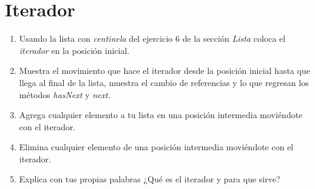 \documentclass[12pt]{article} %
\begin{document}
\section{Iterador}
\begin{enumerate}
\item Usando la lista con \textit{centinela} del ejercicio 6 de la sección \textit{Lista} coloca el \textit{iterador} en la posición inicial.
\item Muestra el movimiento que hace el iterador desde la posición inicial hasta que llega al final de la lista, muestra el cambio de referencias y lo que regresan los métodos \textit{hasNext} y \textit{next}.
\item Agrega cualquier elemento a tu lista en una posición intermedia moviéndote con el iterador.
\item Elimina cualquier elemento de una posición intermedia moviéndote con el iterador.
\item Explica con tus propias palabras ¿Qué es el iterador y para que sirve? 
\end{enumerate}
\end{document}
